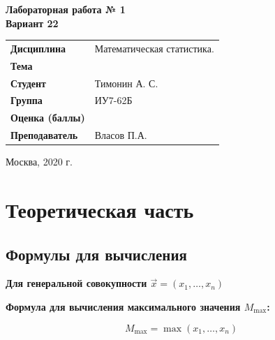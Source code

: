 \documentclass[12pt, a4paper]{report}
\begin{document}
\begin{titlepage}
		\vspace{2cm}
		
		\begin{center}
			\textbf{Лабораторная работа № 1} \\
			\vspace{0.5cm}
			\textbf{Вариант 22}
		\end{center}
		
		\vspace{4cm}
		
		\begin{flushleft}
			\begin{tabular}{ll}
				\textbf{Дисциплина} & Математическая статистика. \\
				\textbf{Тема} & \\
				\textbf{Студент} & Тимонин А. С. \\
				\textbf{Группа} & ИУ7-62Б \\
				\textbf{Оценка (баллы)} & \\
				\textbf{Преподаватель} & Власов П.А. \\
			\end{tabular}
		\end{flushleft}
		
		\vspace{6cm}
		
		\begin{center}
			Москва, 2020 г.
		\end{center}
		
		
	\end{titlepage}
	
	
	\section{Теоретическая часть}
	\subsection{Формулы для вычисления}
	
	\hspace{0.7cm}\textbf{Для генеральной совокупности $\vec{x} = {(x_1, \dots, x_n)}$}
	
	\vspace{0.5cm}\textbf{Формула для вычисления максимального значения $M_{\max}$:}
	
	\begin{equation*} \label{Mmax}
	M_{\max} = \max{(x_1, \dots, x_n)}
	\end{equation*}
	
\end{document}
